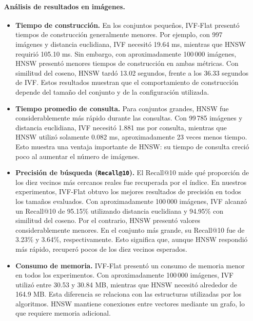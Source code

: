 \documentclass[11pt,a4paper]{article}
\begin{document}
\paragraph{Análisis de resultados en imágenes.}

\begin{itemize}
  \item \textbf{Tiempo de construcción.} En los conjuntos pequeños, IVF-Flat presentó tiempos de construcción generalmente menores. Por ejemplo, con 997 imágenes y distancia euclidiana, IVF necesitó 19.64 ms, mientras que HNSW requirió 105.10 ms. Sin embargo, con aproximadamente 100\,000 imágenes, HNSW presentó menores tiempos de construcción en ambas métricas. Con similitud del coseno, HNSW tardó 13.02 segundos, frente a los 36.33 segundos de IVF. Estos resultados muestran que el comportamiento de construcción depende del tamaño del conjunto y de la configuración utilizada.
  \item \textbf{Tiempo promedio de consulta.} Para conjuntos grandes, HNSW fue considerablemente más rápido durante las consultas. Con 99\,785 imágenes y distancia euclidiana, IVF necesitó 1.881 ms por consulta, mientras que HNSW utilizó solamente 0.082 ms, aproximadamente 23 veces menos tiempo. Esto muestra una ventaja importante de HNSW: su tiempo de consulta creció poco al aumentar el número de imágenes. 
  \item \textbf{Precisión de búsqueda (\texttt{Recall@10}).} El Recall@10 mide qué proporción de los diez vecinos más cercanos reales fue recuperada por el índice. En nuestros experimentos, IVF-Flat obtuvo los mejores resultados de precisión en todos los tamaños evaluados. Con aproximadamente 100\,000 imágenes, IVF alcanzó un Recall@10 de 95.15\% utilizando distancia euclidiana y 94.95\% con similitud del coseno. Por el contrario, HNSW presentó valores considerablemente menores. En el conjunto más grande, su Recall@10 fue de 3.23\% y 3.64\%, respectivamente. Esto significa que, aunque HNSW respondió más rápido, recuperó pocos de los diez vecinos esperados.
  \item \textbf{Consumo de memoria.} IVF-Flat presentó un consumo de memoria menor en todos los experimentos. Con aproximadamente 100\,000 imágenes, IVF utilizó entre 30.53 y 30.84 MB, mientras que HNSW necesitó alrededor de 164.9 MB. Esta diferencia se relaciona con las estructuras utilizadas por los algoritmos. HNSW mantiene conexiones entre vectores mediante un grafo, lo que requiere memoria adicional.
\end{itemize}
\end{document}

